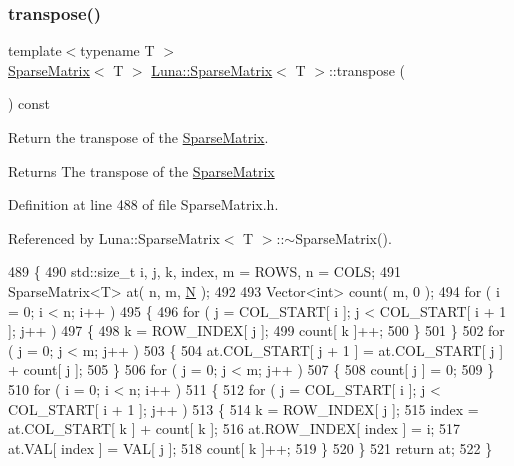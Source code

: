 \subsubsection{\texorpdfstring{transpose()}{transpose()}}
{\footnotesize\ttfamily template$<$typename T $>$ \\
\hyperlink{classLuna_1_1SparseMatrix}{Sparse\+Matrix}$<$ T $>$ \hyperlink{classLuna_1_1SparseMatrix}{Luna\+::\+Sparse\+Matrix}$<$ T $>$\+::transpose (\begin{DoxyParamCaption}{ }\end{DoxyParamCaption}) const\hspace{0.3cm}{\ttfamily [inline]}}



Return the transpose of the \hyperlink{classLuna_1_1SparseMatrix}{Sparse\+Matrix}. 

\begin{DoxyReturn}{Returns}
The transpose of the \hyperlink{classLuna_1_1SparseMatrix}{Sparse\+Matrix} 
\end{DoxyReturn}


Definition at line 488 of file Sparse\+Matrix.\+h.



Referenced by Luna\+::\+Sparse\+Matrix$<$ T $>$\+::$\sim$\+Sparse\+Matrix().


\begin{DoxyCode}
489   \{
490     std::size\_t i, j, k, index, m = ROWS, n = COLS;
491     SparseMatrix<T> at( n, m, \hyperlink{namespaceHeat__plot_a7d050092798e28458a263710837bda77}{N} );
492 
493     Vector<int> count( m, 0 );
494     \textcolor{keywordflow}{for} ( i = 0; i < n; i++ )
495     \{
496       \textcolor{keywordflow}{for} ( j = COL\_START[ i ]; j < COL\_START[ i + 1 ]; j++ )
497       \{
498         k = ROW\_INDEX[ j ];
499         count[ k ]++;
500       \}
501     \}
502     \textcolor{keywordflow}{for} ( j = 0; j < m; j++ )
503     \{
504       at.COL\_START[ j + 1 ] = at.COL\_START[ j ] + count[ j ];
505     \}
506     \textcolor{keywordflow}{for} ( j = 0; j < m; j++ )
507     \{
508       count[ j ] = 0;
509     \}
510     \textcolor{keywordflow}{for} ( i = 0; i < n; i++ )
511     \{
512       \textcolor{keywordflow}{for} ( j = COL\_START[ i ]; j < COL\_START[ i + 1 ]; j++ )
513       \{
514         k = ROW\_INDEX[ j ];
515         index = at.COL\_START[ k ] + count[ k ];
516         at.ROW\_INDEX[ index ] = i;
517         at.VAL[ index ] = VAL[ j ];
518         count[ k ]++;
519       \}
520     \}
521     \textcolor{keywordflow}{return} at;
522   \}
\end{DoxyCode}
\mbox{\label{classLuna_1_1SparseMatrix_a64e3d0328b1eaba4f2f75e70b4fe1bb8}} 
